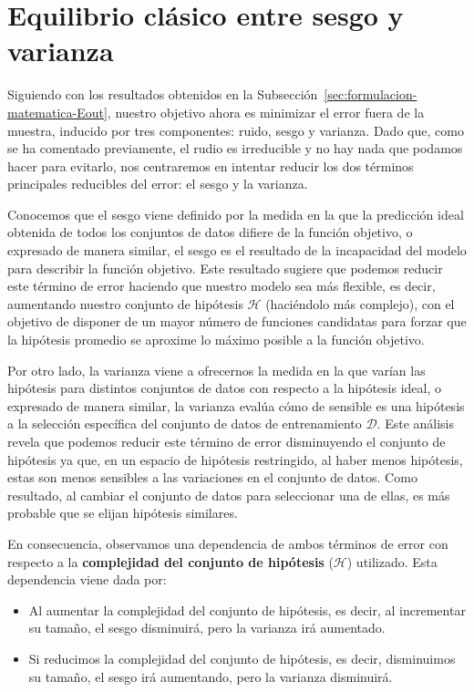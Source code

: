 \section{Equilibrio clásico entre sesgo y varianza}\label{sec:equilibrio-sesgo-varianza}
Siguiendo con los resultados obtenidos en la Subsección~\ref{sec:formulacion-matematica-Eout}, nuestro objetivo ahora es minimizar el error fuera de la muestra, inducido por tres componentes: ruido, sesgo y varianza. Dado que, como se ha comentado previamente, el rudio es irreducible y no hay nada que podamos hacer para evitarlo, nos centraremos en intentar reducir los dos términos principales reducibles del error: el sesgo y la varianza.

Conocemos que el sesgo viene definido por la medida en la que la predicción ideal obtenida de todos los conjuntos de datos difiere de la función objetivo, o expresado de manera similar, el sesgo es el resultado de la incapacidad del modelo para describir la función objetivo. Este resultado sugiere que podemos reducir este término de error haciendo que nuestro modelo sea más flexible, es decir, aumentando nuestro conjunto de hipótesis $\mathcal{H}$ (haciéndolo más complejo), con el objetivo de disponer de un mayor número de funciones candidatas para forzar que la hipótesis promedio se aproxime lo máximo posible a la función objetivo.

Por otro lado, la varianza viene a ofrecernos la medida en la que varían las hipótesis para distintos conjuntos de datos con respecto a la hipótesis ideal, o expresado de manera similar, la varianza evalúa cómo de sensible es una hipótesis a la selección específica del conjunto de datos de entrenamiento $\mathcal{D}$. Este análisis revela que podemos reducir este término de error disminuyendo el conjunto de hipótesis ya que, en un espacio de hipótesis restringido, al haber menos hipótesis, estas son menos sensibles a las variaciones en el conjunto de datos. Como resultado, al cambiar el conjunto de datos para seleccionar una de ellas, es más probable que se elijan hipótesis similares.

En consecuencia, observamos una dependencia de ambos términos de error con respecto a la \textbf{complejidad del conjunto de hipótesis} ($\mathcal{H}$) utilizado. Esta dependencia viene dada por:

\begin{itemize}
    \item Al aumentar la complejidad del conjunto de hipótesis, es decir, al incrementar su tamaño, el sesgo disminuirá, pero la varianza irá aumentado.
    \item Si reducimos la complejidad del conjunto de hipótesis, es decir, disminuimos su tamaño, el sesgo irá aumentando, pero la varianza disminuirá.
\end{itemize}

